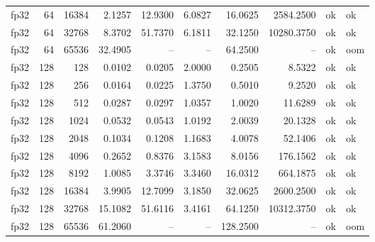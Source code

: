 \begin{tabular}{lrrrrrrrll}
fp32 & 64 & 16384 & 2.1257 & 12.9300 & 6.0827 & 16.0625 & 2584.2500 & ok & ok \\
fp32 & 64 & 32768 & 8.3702 & 51.7370 & 6.1811 & 32.1250 & 10280.3750 & ok & ok \\
fp32 & 64 & 65536 & 32.4905 & -- & -- & 64.2500 & -- & ok & oom \\
fp32 & 128 & 128 & 0.0102 & 0.0205 & 2.0000 & 0.2505 & 8.5322 & ok & ok \\
fp32 & 128 & 256 & 0.0164 & 0.0225 & 1.3750 & 0.5010 & 9.2520 & ok & ok \\
fp32 & 128 & 512 & 0.0287 & 0.0297 & 1.0357 & 1.0020 & 11.6289 & ok & ok \\
fp32 & 128 & 1024 & 0.0532 & 0.0543 & 1.0192 & 2.0039 & 20.1328 & ok & ok \\
fp32 & 128 & 2048 & 0.1034 & 0.1208 & 1.1683 & 4.0078 & 52.1406 & ok & ok \\
fp32 & 128 & 4096 & 0.2652 & 0.8376 & 3.1583 & 8.0156 & 176.1562 & ok & ok \\
fp32 & 128 & 8192 & 1.0085 & 3.3746 & 3.3460 & 16.0312 & 664.1875 & ok & ok \\
fp32 & 128 & 16384 & 3.9905 & 12.7099 & 3.1850 & 32.0625 & 2600.2500 & ok & ok \\
fp32 & 128 & 32768 & 15.1082 & 51.6116 & 3.4161 & 64.1250 & 10312.3750 & ok & ok \\
fp32 & 128 & 65536 & 61.2060 & -- & -- & 128.2500 & -- & ok & oom \\
\bottomrule
\end{tabular}
